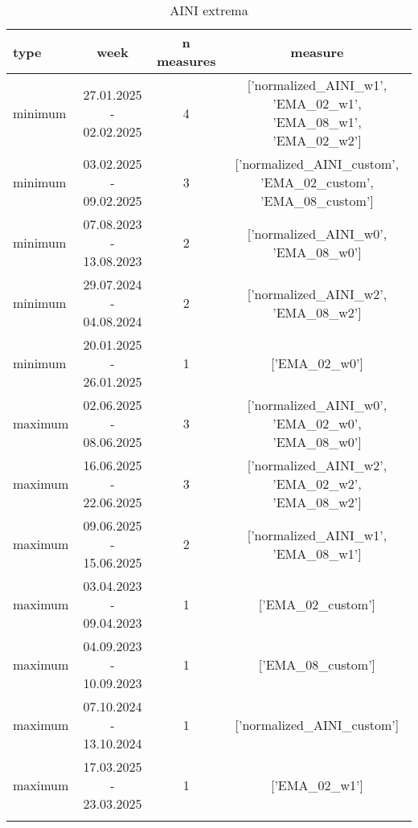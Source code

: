 \begin{table}[!htbp]
\centering
\begin{adjustbox}{width=\textwidth}
\begin{tabular}{lccc}
\toprule
\addlinespace
type & week & n measures & measure \\
\midrule
\addlinespace
minimum & 27.01.2025 - 02.02.2025 & 4 & ['normalized_AINI_w1', 'EMA_02_w1', 'EMA_08_w1', 'EMA_02_w2'] \\
minimum & 03.02.2025 - 09.02.2025 & 3 & ['normalized_AINI_custom', 'EMA_02_custom', 'EMA_08_custom'] \\
minimum & 07.08.2023 - 13.08.2023 & 2 & ['normalized_AINI_w0', 'EMA_08_w0'] \\
minimum & 29.07.2024 - 04.08.2024 & 2 & ['normalized_AINI_w2', 'EMA_08_w2'] \\
minimum & 20.01.2025 - 26.01.2025 & 1 & ['EMA_02_w0'] \\
maximum & 02.06.2025 - 08.06.2025 & 3 & ['normalized_AINI_w0', 'EMA_02_w0', 'EMA_08_w0'] \\
maximum & 16.06.2025 - 22.06.2025 & 3 & ['normalized_AINI_w2', 'EMA_02_w2', 'EMA_08_w2'] \\
maximum & 09.06.2025 - 15.06.2025 & 2 & ['normalized_AINI_w1', 'EMA_08_w1'] \\
maximum & 03.04.2023 - 09.04.2023 & 1 & ['EMA_02_custom'] \\
maximum & 04.09.2023 - 10.09.2023 & 1 & ['EMA_08_custom'] \\
maximum & 07.10.2024 - 13.10.2024 & 1 & ['normalized_AINI_custom'] \\
maximum & 17.03.2025 - 23.03.2025 & 1 & ['EMA_02_w1'] \\
\addlinespace
\bottomrule
\end{tabular}
\end{adjustbox}
\caption{AINI extrema}
\label{tab:aini_extrema}
\end{table}
